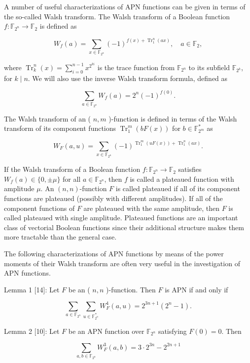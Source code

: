 \documentclass[10pt]{article}
\begin{document}
A number of useful characterizations of APN functions can be given in terms of the so-called Walsh transform. The Walsh transform of a Boolean function $f: \mathbb{F}_{2^{n}} \rightarrow \mathbb{F}_{2}$ is defined as

$$
W_{f}(a)=\sum_{x \in \mathbb{F}_{2^{n}}}(-1)^{f(x)+\operatorname{Tr}_{1}^{n}(a x)}, \quad a \in \mathbb{F}_{2},
$$

where $\operatorname{Tr}_{k}^{n}(x)=\sum_{i=0}^{n-1} x^{2^{k i}}$ is the trace function from $\mathbb{F}_{2^{n}}$ to its subfield $\mathbb{F}_{2^{k}}$, for $k \mid n$. We will also use the inverse Walsh transform formula, defined as

$$
\sum_{a \in \mathbb{F}_{2^{n}}} W_{f}(a)=2^{n}(-1)^{f(0)} .
$$

The Walsh transform of an ( $n, m$ )-function is defined in terms of the Walsh transform of its component functions $\operatorname{Tr}_{1}^{m}(b F(x))$ for $b \in \mathbb{F}_{2^{m}}^{*}$ as

$$
W_{F}(a, u)=\sum_{x \in \mathbb{F}_{2^{n}}}(-1)^{\operatorname{Tr}_{1}^{m}(u F(x))+\operatorname{Tr}_{1}^{n}(a x)} .
$$

If the Walsh transform of a Boolean function $f: \mathbb{F}_{2^{n}} \rightarrow \mathbb{F}_{2}$ satisfies $W_{f}(a) \in\{0, \pm \mu\}$ for all $a \in \mathbb{F}_{2^{n}}$, then $f$ is called a plateaued function with amplitude $\mu$. An $(n, n)$-function $F$ is called plateaued if all of its component functions are plateaued (possibly with different amplitudes). If all of the component functions of $F$ are plateaued with the same amplitude, then $F$ is called plateaued with single amplitude. Plateaued functions are an important class of vectorial Boolean functions since their additional structure makes them more tractable than the general case.

The following characterizations of APN functions by means of the power moments of their Walsh transform are often very useful in the investigation of APN functions.

Lemma 1 [14]: Let $F$ be an ( $n, n$ )-function. Then $F$ is APN if and only if

$$
\sum_{a \in \mathbb{F}_{2^{n}}} \sum_{u \in \mathbb{F}_{2^{n}}^{*}} W_{F}^{4}(a, u)=2^{3 n+1}\left(2^{n}-1\right) .
$$

Lemma 2 [10]: Let $F$ be an APN function over $\mathbb{F}_{2^{n}}$ satisfying $F(0)=0$. Then

$$
\sum_{a, b \in \mathbb{F}_{2^{n}}} W_{F}^{3}(a, b)=3 \cdot 2^{3 n}-2^{2 n+1}
$$
\end{document}
